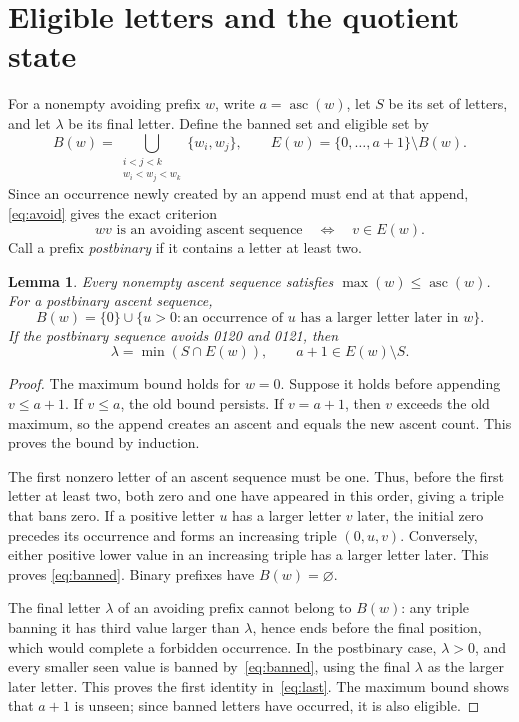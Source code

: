 \documentclass[11pt]{article}
\newtheorem{lemma}[theorem]{Lemma}
\theoremstyle{remark}
\DeclareMathOperator{\asc}{asc}
\begin{document}
\section{Eligible letters and the quotient state}

For a nonempty avoiding prefix $w$, write $a=\asc(w)$, let $S$ be its set
of letters, and let $\lambda$ be its final letter. Define the banned set
and eligible set by
\begin{equation}\label{eq:eligible}
 B(w)=\bigcup_{\substack{i<j<k\\w_i<w_j<w_k}}\{w_i,w_j\},
 \qquad E(w)=\{0,\ldots,a+1\}\setminus B(w).
\end{equation}
Since an occurrence newly created by an append must end at that append,
\eqref{eq:avoid} gives the exact criterion
\begin{equation}\label{eq:append}
 wv\text{ is an avoiding ascent sequence}\quad\Longleftrightarrow
 \quad v\in E(w).
\end{equation}
Call a prefix \emph{postbinary} if it contains a letter at least two.

\begin{lemma}\label{lem:invariants}
Every nonempty ascent sequence satisfies $\max(w)\leq\asc(w)$. For a postbinary
ascent sequence,
\begin{equation}\label{eq:banned}
 B(w)=\{0\}\cup
 \{u>0:\text{an occurrence of $u$ has a larger letter later in $w$}\}.
\end{equation}
If the postbinary sequence avoids 0120 and 0121, then
\begin{equation}\label{eq:last}
 \lambda=\min(S\cap E(w)),\qquad a+1\in E(w)\setminus S.
\end{equation}
\end{lemma}

\begin{proof}
The maximum bound holds for $w=0$. Suppose it holds before appending
$v\leq a+1$. If $v\leq a$, the old bound persists. If $v=a+1$, then $v$
exceeds the old maximum, so the append creates an ascent and equals the
new ascent count. This proves the bound by induction.

The first nonzero letter of an ascent sequence must be one. Thus, before
the first letter at least two, both zero and one have appeared in this
order, giving a triple that bans zero. If a positive letter $u$ has a
larger letter $v$ later, the initial zero precedes its occurrence and
forms an increasing triple $(0,u,v)$. Conversely, either positive lower
value in an increasing triple has a larger letter later. This proves
\eqref{eq:banned}. Binary prefixes have $B(w)=\varnothing$.

The final letter $\lambda$ of an avoiding prefix cannot belong to $B(w)$:
any triple banning it has third value larger than $\lambda$, hence ends
before the final position, which would complete a forbidden occurrence.
In the postbinary case, $\lambda>0$, and every smaller seen value is banned
by~\eqref{eq:banned}, using the final $\lambda$ as the larger later letter.
This proves the first identity in~\eqref{eq:last}. The maximum bound
shows that $a+1$ is unseen; since banned letters have occurred, it is
also eligible.
\end{proof}
\end{document}

